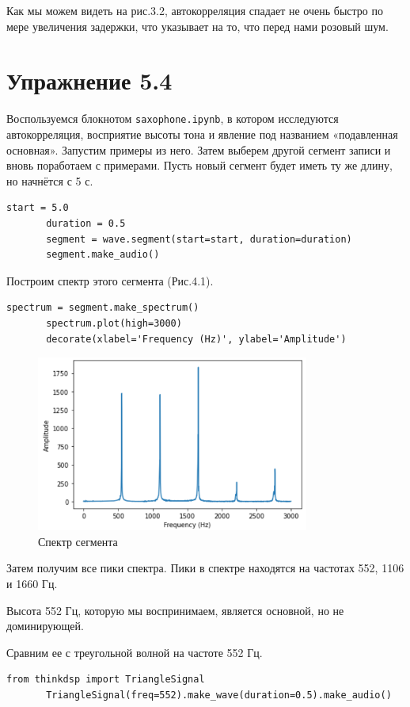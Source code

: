 \documentclass[a4paper,12pt]{report}
\begin{document}
     Как мы можем видеть на рис.3.2, автокорреляция спадает не очень быстро по мере увеличения задержки, что указывает на то, что перед нами розовый шум.
 
\chapter{Упражнение 5.4}
    Воспользуемся блокнотом \texttt{saxophone.ipynb}, в котором исследуются автокорреляция, восприятие высоты тона и явление под названием «подавленная основная». Запустим примеры из него. Затем выберем другой сегмент записи и вновь поработаем с примерами.
    Пусть новый сегмент будет иметь ту же длину, но начнётся с 5 с.
\begin{lstlisting}[caption=Выделение сегмента]
       start = 5.0
       duration = 0.5
       segment = wave.segment(start=start, duration=duration)
       segment.make_audio()
\end{lstlisting} 

    Построим спектр этого сегмента (Рис.4.1).
\begin{lstlisting}[caption=Построение спектра сегмента]
       spectrum = segment.make_spectrum()
       spectrum.plot(high=3000)
       decorate(xlabel='Frequency (Hz)', ylabel='Amplitude')
\end{lstlisting}
\begin{figure}[H]
        \centering
        \includegraphics[width=0.8\textwidth]{fig4-1.PNG}
        \caption{Спектр сегмента}
        \label{fig:fig4-1}
\end{figure}

    Затем получим все пики спектра. Пики в спектре находятся на частотах 552, 1106 и 1660 Гц.                    
    
    Высота 552 Гц, которую мы воспринимаем, является основной, но не доминирующей.

    Сравним ее с треугольной волной на частоте 552 Гц.
\begin{lstlisting}[caption=Получение треугольной волны]
       from thinkdsp import TriangleSignal
       TriangleSignal(freq=552).make_wave(duration=0.5).make_audio()
\end{lstlisting}
\end{document}
